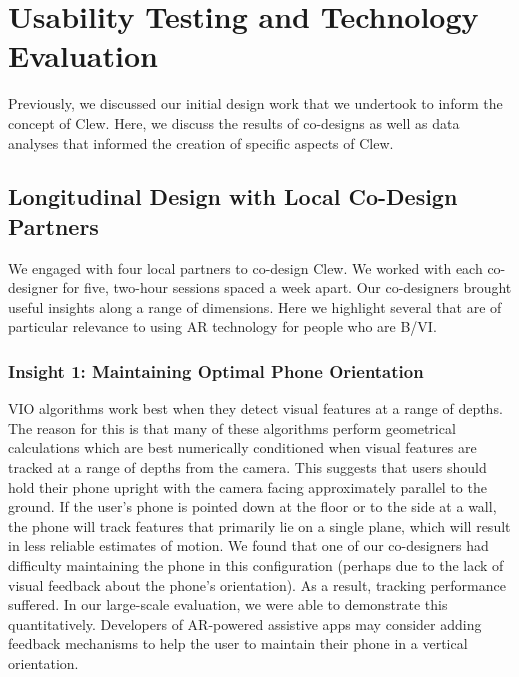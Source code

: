 \documentclass[chi]{sigchi}
\newcommand{\BVI}{B/VI\xspace}
\begin{document}
\section{Usability Testing and Technology Evaluation}\label{sec:usabilityandevaluation}
Previously, we discussed our initial design work that we undertook to inform the concept of Clew.  Here, we discuss the results of co-designs as well as data analyses that informed the creation of specific aspects of Clew. %

\subsection{Longitudinal Design with Local Co-Design Partners}
We engaged with four local partners to co-design Clew.  We worked with each co-designer for five, two-hour sessions spaced a week apart.  Our co-designers brought useful insights along a range of dimensions.  Here we highlight several that are of particular relevance to using AR technology for people who are \BVI.

\subsubsection{Insight 1: Maintaining Optimal Phone Orientation}
VIO algorithms work best when they detect visual features at a range of depths.  The reason for this is that many of these algorithms perform geometrical calculations which are best numerically conditioned when visual features are tracked at a range of depths from the camera.  This suggests that users should hold their phone upright with the camera facing approximately parallel to the ground.  If the user's phone is pointed down at the floor or to the side at a wall, the phone will track features that primarily lie on a single plane, which will result in less reliable estimates of motion.  We found that one of our co-designers had difficulty maintaining the phone in this configuration (perhaps due to the lack of visual feedback about the phone's orientation).  As a result, tracking performance suffered.  In our large-scale evaluation, we were able to demonstrate this quantitatively.  Developers of AR-powered assistive apps may consider adding feedback mechanisms to help the user to maintain their phone in a vertical orientation.
\end{document}
